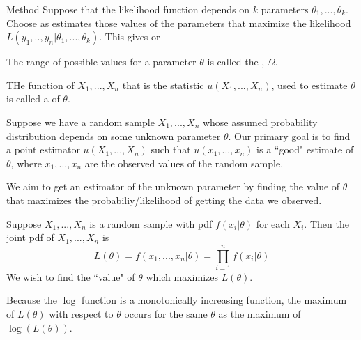 \documentclass[12pt, a4paper, twoside, openright, titlepage]{book}
\begin{document}
\begin{proc}{Method}{}
    Suppose that the likelihood function depends on $k$ parameters $\theta_1,...,\theta_k$. Choose as estimates those values of the parameters that maximize the likelihood $L(y_1,..,y_n\vert \theta_1,...,\theta_k)$. This gives  or 
\end{proc}


\begin{defn}{}{}
    The range of possible values for a parameter $\theta$ is called the , $\Omega$.
\end{defn}

\begin{defn}{}{}
    THe function of $X_1,...,X_n$ that is the statistic $u(X_1,...,X_n)$, used to estimate $\theta$ is called a  of $\theta$.
\end{defn}


\begin{rmk}{}{}
    Suppose we have a random sample $X_1,...,X_n$ whose assumed probability distribution depends on some unknown parameter $\theta$. Our primary goal is to find a point estimator $u(X_1,...,X_n)$ such that $u(x_1,...,x_n)$ is a ``good" estimate of $\theta$, where $x_1,...,x_n$ are the observed values of the random sample.
\end{rmk}


\begin{note}{}{}
    We aim to get an estimator of the unknown parameter by finding the value of $\theta$ that maximizes the probabiliy/likelihood of getting the data we observed.


    Suppose $X_1,...,X_n$ is a random sample with pdf $f(x_i\vert\theta)$ for each $X_i$. Then the joint pdf of $X_1,...,X_n$ is \begin{equation*}
        L(\theta) = f(x_1,...,x_n\vert\theta) = \prod_{i=1}^nf(x_i\vert\theta)
    \end{equation*}
    We wish to find the ``value" of $\theta$ which maximizes $L(\theta)$.
\end{note}

\begin{note}{}{}
    Because the $\log$ function is a monotonically increasing function, the maximum of $L(\theta)$ with respect to $\theta$ occurs for the same $\theta$ as the maximum of $\log(L(\theta))$.
\end{note}
\end{document}
